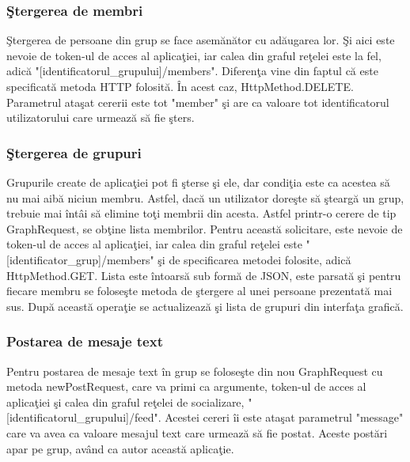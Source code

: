 \subsubsection{\c{S}tergerea de membri}

\c{S}tergerea de persoane din grup se face asem\u{a}n\u{a}tor cu ad\u{a}ugarea lor. \c{S}i aici este nevoie de token-ul de acces al aplica\c{t}iei, iar calea din graful re\c{t}elei este la fel, adic\u{a} "[identificatorul_grupului]/members". Diferen\c{t}a vine din faptul c\u{a} este specificat\u{a} metoda HTTP folosit\u{a}. \^{I}n acest caz, HttpMethod.DELETE. Parametrul ata\c{s}at cererii este tot "member" \c{s}i are ca valoare tot identificatorul utilizatorului care urmeaz\u{a} s\u{a} fie \c{s}ters.

\subsubsection{\c{S}tergerea de grupuri}

Grupurile create de aplica\c{t}iei pot fi \c{s}terse \c{s}i ele, dar condi\c{t}ia este ca acestea s\u{a} nu mai aib\u{a} niciun membru. Astfel, dac\u{a} un utilizator dore\c{s}te s\u{a} \c{s}tearg\u{a} un grup, trebuie mai \^{i}nt\^{a}i s\u{a} elimine to\c{t}i membrii din acesta. Astfel printr-o cerere de tip GraphRequest, se ob\c{t}ine lista membrilor. Pentru aceast\u{a} solicitare, este nevoie de token-ul de acces al aplica\c{t}iei, iar calea din graful re\c{t}elei este "[identificator_grup]/members" \c{s}i de specificarea metodei folosite, adic\u{a} HttpMethod.GET. Lista este \^{i}ntoars\u{a} sub form\u{a} de JSON, este parsat\u{a} \c{s}i pentru fiecare membru se folose\c{s}te metoda de \c{s}tergere al unei persoane prezentat\u{a} mai sus. Dup\u{a} aceast\u{a} opera\c{t}ie se actualizeaz\u{a} \c{s}i lista de grupuri din interfa\c{t}a grafic\u{a}.

\subsubsection{Postarea de mesaje text}

Pentru postarea de mesaje text \^{i}n grup se folose\c{s}te din nou GraphRequest cu metoda newPostRequest, care va primi ca argumente, token-ul de acces al aplica\c{t}iei \c{s}i calea din graful re\c{t}elei de socializare, "[identificatorul_grupului]/feed". Acestei cereri \^{i}i este ata\c{s}at parametrul "message" care va avea ca valoare mesajul text care urmeaz\u{a} s\u{a} fie postat. Aceste post\u{a}ri apar pe grup, av\^{a}nd ca autor aceast\u{a} aplica\c{t}ie. 

